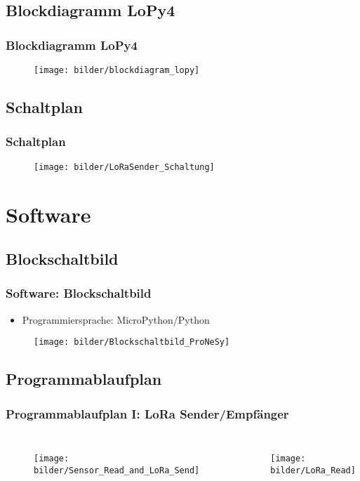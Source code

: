 \documentclass[12pt,utf8]{beamer}
\begin{document}
\subsection{Blockdiagramm LoPy4}
\begin{frame}
\frametitle{Blockdiagramm LoPy4}
\begin{figure}
 \texttt{[image: bilder/blockdiagram\_lopy]}
\end{figure}
\end{frame}

\subsection{Schaltplan}
\begin{frame}
\frametitle{Schaltplan}
\begin{figure}
 \texttt{[image: bilder/LoRaSender\_Schaltung]}
\end{figure}
\end{frame}

\section{Software}
\subsection{Blockschaltbild}
\begin{frame}
\frametitle{Software: Blockschaltbild}
\begin{itemize}
\item Programmiersprache: MicroPython/Python 
\end{itemize}
\begin{figure}
 \texttt{[image: bilder/Blockschaltbild\_ProNeSy]}
\end{figure}
\end{frame}

\subsection{Programmablaufplan}
\begin{frame}
\frametitle{Programmablaufplan I: LoRa Sender/Empfänger}
\begin{columns}
\begin{figure}
\texttt{[image: bilder/Sensor\_Read\_and\_LoRa\_Send]}
\end{figure}
\begin{figure}
 \texttt{[image: bilder/LoRa\_Read]}
\end{figure}
\end{columns}
\end{frame}
\end{document}
